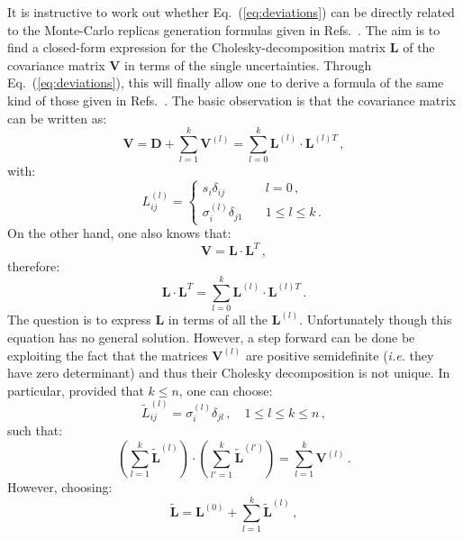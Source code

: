 \documentclass[10pt,a4paper]{article}
\begin{document}
It is instructive to work out whether Eq.~(\ref{eq:deviations}) can be
directly related to the Monte-Carlo replicas generation formulas given
in Refs.~\cite{Ball:2008by, Ball:2014uwa}. The aim is to find a
closed-form expression for the Cholesky-decomposition matrix
$\mathbf{L}$ of the covariance matrix $\mathbf{V}$ in terms of the
single uncertainties. Through Eq.~(\ref{eq:deviations}), this will
finally allow one to derive a formula of the same kind of those given
in Refs.~\cite{Ball:2008by, Ball:2014uwa}. The basic observation is
that the covariance matrix can be written as:
\begin{equation}
\mathbf{V} = \mathbf{D}+ \sum_{l=1}^k 
\mathbf{V}^{(l)} = \sum_{l=0}^k \mathbf{L}^{(l)}\cdot \mathbf{L}^{(l)T}\,,
\end{equation}
with:
\begin{equation}
L_{ij}^{(l)}=\left\{
\begin{array}{ll}
s_i\delta_{ij}&\quad l = 0\,,\\
\sigma_i^{(l)}\delta_{j1}&\quad 1\leq l\leq k\,.
\end{array}
\right.
\end{equation}
On the other hand, one also knows that:
\begin{equation}
  \mathbf{V} = \mathbf{L}\cdot \mathbf{L}^T\,,
\end{equation}
therefore:
\begin{equation}
  \mathbf{L}\cdot \mathbf{L}^T=\sum_{l=0}^k \mathbf{L}^{(l)}\cdot \mathbf{L}^{(l)T}\,.
\end{equation}
The question is to express $\mathbf{L}$ in terms of all the
$\mathbf{L}^{(l)}$. Unfortunately though this equation has no general
solution. However, a step forward can be done be exploiting the fact
that the matrices $\mathbf{V}^{(l)}$ are positive semidefinite
(\textit{i.e.} they have zero determinant) and thus their Cholesky
decomposition is not unique. In particular, provided that $k\leq n$,
one can choose:
\begin{equation}\label{eq:choldecomp2}
\widetilde{L}_{ij}^{(l)}=
\sigma_i^{(l)}\delta_{jl}\,,\quad 1\leq l\leq k\leq n\,,
\end{equation}
such that:
\begin{equation}
  \left(\sum_{l=1}^k\widetilde{\mathbf{L}}^{(l)}\right)\cdot\left(
    \sum_{l'=1}^k\widetilde{\mathbf{L}}^{(l')}\right)=\sum_{l=1}^k 
  \mathbf{V}^{(l)}\,.
\end{equation}
However, choosing:
\begin{equation}\label{eq:CholVapprox}
\widetilde{\mathbf{L}} = \mathbf{L}^{(0)} + \sum_{l=1}^k\widetilde{\mathbf{L}}^{(l)}\,,
\end{equation}
\end{document}
